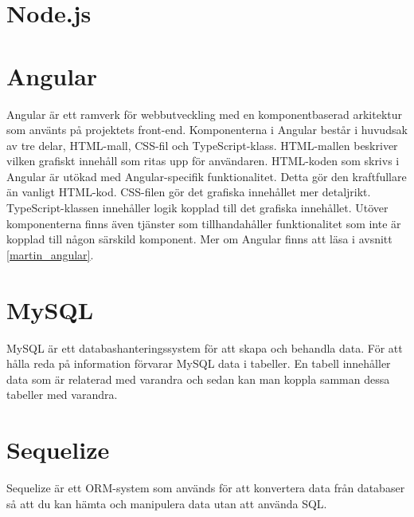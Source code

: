 \section{Node.js}

\section{Angular}
Angular är ett ramverk för webbutveckling med en komponentbaserad arkitektur som använts på projektets front-end. Komponenterna i Angular består i huvudsak av tre delar, HTML-mall, CSS-fil och TypeScript-klass. 
HTML-mallen beskriver vilken grafiskt innehåll som ritas upp för användaren. HTML-koden som skrivs i Angular är utökad med Angular-specifik funktionalitet. Detta gör den kraftfullare än vanligt HTML-kod.
CSS-filen gör det grafiska innehållet mer detaljrikt.
TypeScript-klassen innehåller logik kopplad till det grafiska innehållet.
Utöver komponenterna finns även tjänster som tillhandahåller funktionalitet som inte är kopplad till någon särskild komponent. Mer om Angular finns att läsa i avsnitt \ref{martin_angular}.
 
\section{MySQL}
MySQL är ett databashanteringssystem för att skapa och behandla data. För att hålla reda på information förvarar MySQL data i tabeller. En tabell innehåller data som är relaterad med varandra och sedan kan man koppla samman dessa tabeller med varandra.
\cite{mysql}

\section{Sequelize}
Sequelize är ett ORM-system som används för att konvertera data från databaser så att du kan hämta och manipulera data utan att använda SQL.
\cite{sequelize}
